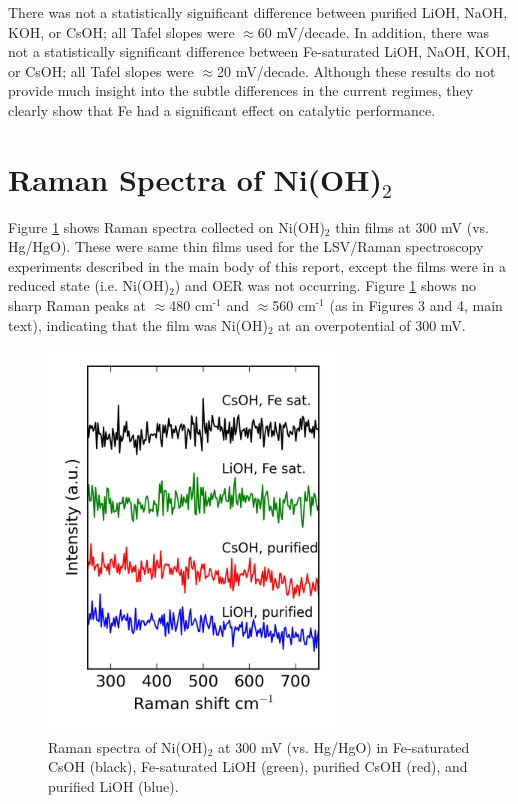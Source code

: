 \documentclass[journal=jpccck,manuscript=suppinfo,email=true]{achemso}
\begin{document}
There was not a statistically significant difference between purified LiOH, NaOH, KOH, or CsOH; all Tafel slopes were $\approx$60 mV/decade. In addition, there was not a statistically significant difference between Fe-saturated LiOH, NaOH, KOH, or CsOH; all Tafel slopes were $\approx$20 mV/decade. Although these results do not provide much insight into the subtle differences in the current regimes, they clearly show that Fe had a significant effect on catalytic performance.

\section{Raman Spectra of Ni(OH)$_{\text{2}}$}
\label{sec-3}
Figure \ref{fig-s7} shows Raman spectra collected on Ni(OH)$_{\text{2}}$ thin films at 300 mV (vs. Hg/HgO). These were same thin films used for the LSV/Raman spectroscopy experiments described in the main body of this report, except the films were in a reduced state (i.e. Ni(OH)$_{\text{2}}$) and OER was not occurring. Figure \ref{fig-s7} shows no sharp Raman peaks at $\approx$480 cm$^{\text{-1}}$ and $\approx$560 cm$^{\text{-1}}$ (as in Figures 3 and 4, main text), indicating that the film was Ni(OH)$_{\text{2}}$ at an overpotential of 300 mV.

\begin{figure}[h]
\centering
\includegraphics[width=3in]{./images/figures-supp-info/raman-nioh2-pure-iron.png}
\caption{\label{fig-s7}Raman spectra of Ni(OH)$_{\text{2}}$ at 300 mV (vs. Hg/HgO) in Fe-saturated CsOH (black), Fe-saturated LiOH (green), purified CsOH (red), and purified LiOH (blue).}
\end{figure}
\end{document}
